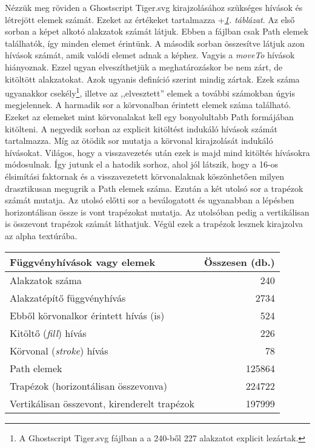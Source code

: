 \documentclass[12pt]{report}
\theoremstyle{definition}
\newcommand{\func}[1]{{\textsl{#1}}}
\begin{document}
Nézzük meg röviden a Ghostscript Tiger.svg kirajzolásához szükséges hívások és
létrejött elemek számát. Ezeket az értékeket tartalmazza
\az+\emph{\ref{tab:numbers}. táblázat}. Az első sorban a képet alkotó alakzatok
számát látjuk. Ebben a fájlban csak Path elemek találhatók, így minden elemet
érintünk. A második sorban összesítve látjuk azon hívások számát, amik valódi
elemet adnak a képhez. Vagyis a \func{moveTo} hívások hiányoznak. Ezzel ugyan
elveszíthetjük a meghatározáskor be nem zárt, de kitöltött alakzatokat. Azok
ugyanis definíció szerint mindig zártak. Ezek száma ugyanakkor
csekély\footnote{A Ghostscript Tiger.svg fájlban a a 240-ből 227 alakzatot
explicit lezártak.}, illetve az ,,elvesztett'' elemek a további számokban úgyis
megjelennek. A harmadik sor a körvonalban érintett elemek száma található.
Ezeket az elemeket mint körvonalakat kell egy bonyolultabb Path formájában
kitölteni. A negyedik sorban az explicit kitöltést indukáló hívások számát
tartalmazza. Míg az ötödik sor mutatja a körvonal kirajzolását indukáló
hívásokat. Világos, hogy a visszavezetés után ezek is majd mind kitöltés
hívásokra módosulnak. Így jutunk el a hatodik sorhoz, ahol jól látszik, hogy a
16-os élsimítási faktornak és a visszavezetett körvonalaknak köszönhetően
milyen drasztikusan megugrik a Path elemek száma. Ezután a két utolsó sor a
trapézok számát mutatja. Az utolsó előtti sor a beválogatott és ugyanabban a
lépésben horizontálisan össze is vont trapézokat mutatja. Az utolsóban pedig a
vertikálisan is összevont trapézok számát láthatjuk. Végül ezek a trapézok
lesznek kirajzolva az alpha textúrába.

  \begin{table}[!t]
     \label{tab:numbers}
    \renewcommand*{\arraystretch}{1.2}
    \small
    \centering
    \begin{tabular}{|l|r|}
      \hline
      Függvényhívások vagy elemek & Összesen (db.) \\
      \hline \hline
      Alakzatok száma & 240\\
      Alakzatépítő függvényhívás & 2734\\
      Ebből körvonalkor érintett hívás (is) & 524\\
      \hline
      Kitöltő (\func{fill}) hívás & 226 \\
      Körvonal (\func{stroke}) hívás & 78 \\
      \hline
      Path elemek & 125864 \\
      Trapézok (horizontálisan összevonva) & 224722 \\
      Vertikálisan összevont, kirenderelt trapézok & 197999 \\
      \hline
    \end{tabular}
  \end{table}
\end{document}
